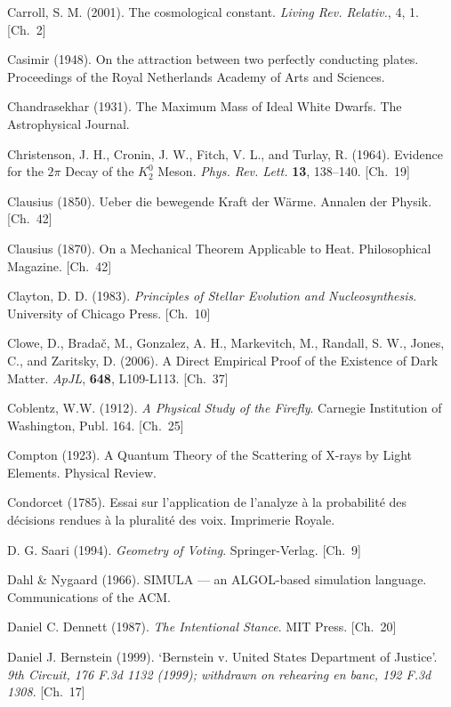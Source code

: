 \begin{list}{}{%
  \setlength{\leftmargin}{2em}%
  \setlength{\itemindent}{-2em}%
  \setlength{\itemsep}{0.35\baselineskip}%
  \setlength{\parsep}{0pt}%
  \setlength{\topsep}{0.5em}}
\item Carroll, S. M. (2001). The cosmological constant. \textit{Living Rev. Relativ.}, 4, 1. \hfill {\scriptsize [Ch.~2]}
\item Casimir (1948). On the attraction between two perfectly conducting plates. Proceedings of the Royal Netherlands Academy of Arts and Sciences.
\item Chandrasekhar (1931). The Maximum Mass of Ideal White Dwarfs. The Astrophysical Journal.
\item Christenson, J. H., Cronin, J. W., Fitch, V. L., and Turlay, R. (1964). Evidence for the $2\pi$ Decay of the $K_2^0$ Meson. \textit{Phys. Rev. Lett.} \textbf{13}, 138–140. \hfill {\scriptsize [Ch.~19]}
\item Clausius (1850). Ueber die bewegende Kraft der Wärme. Annalen der Physik. \hfill {\scriptsize [Ch.~42]}
\item Clausius (1870). On a Mechanical Theorem Applicable to Heat. Philosophical Magazine. \hfill {\scriptsize [Ch.~42]}
\item Clayton, D. D. (1983). \textit{Principles of Stellar Evolution and Nucleosynthesis}. University of Chicago Press. \hfill {\scriptsize [Ch.~10]}
\item Clowe, D., Brada\v{c}, M., Gonzalez, A. H., Markevitch, M., Randall, S. W., Jones, C., and Zaritsky, D. (2006). A Direct Empirical Proof of the Existence of Dark Matter. \textit{ApJL}, \textbf{648}, L109-L113. \hfill {\scriptsize [Ch.~37]}
\item Coblentz, W.W. (1912). \textit{A Physical Study of the Firefly}. Carnegie Institution of Washington, Publ. 164. \hfill {\scriptsize [Ch.~25]}
\item Compton (1923). A Quantum Theory of the Scattering of X-rays by Light Elements. Physical Review.
\item Condorcet (1785). Essai sur l'application de l'analyze à la probabilité des décisions rendues à la pluralité des voix. Imprimerie Royale.
\item D. G. Saari (1994). \textit{Geometry of Voting}. Springer-Verlag. \hfill {\scriptsize [Ch.~9]}
\item Dahl \& Nygaard (1966). SIMULA — an ALGOL-based simulation language. Communications of the ACM.
\item Daniel C. Dennett (1987). \textit{The Intentional Stance}. MIT Press. \hfill {\scriptsize [Ch.~20]}
\item Daniel J. Bernstein (1999). `Bernstein v. United States Department of Justice'. \textit{9th Circuit, 176 F.3d 1132 (1999); withdrawn on rehearing en banc, 192 F.3d 1308}. \hfill {\scriptsize [Ch.~17]}

\end{list}
